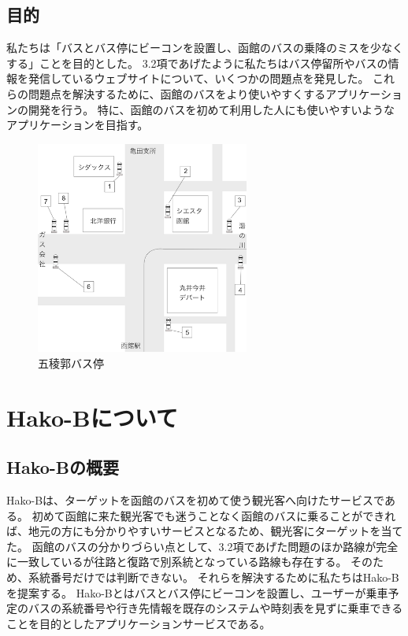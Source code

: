 \documentclass[openany,11pt,papersize]{jsbook}
\begin{document}

\section{目的}\label{sec:gaiyou}
私たちは「バスとバス停にビーコンを設置し、函館のバスの乗降のミスを少なくする」ことを目的とした。
3.2項であげたように私たちはバス停留所やバスの情報を発信しているウェブサイトについて、いくつかの問題点を発見した。
これらの問題点を解決するために、函館のバスをより使いやすくするアプリケーションの開発を行う。
特に、函館のバスを初めて利用した人にも使いやすいようなアプリケーションを目指す。


\begin{figure}[htbp]
  \begin{center}
    \includegraphics[clip,width=7.0cm]{img/14007.png}
    \caption{五稜郭バス停}
    \label{fig:goryo}
  \end{center}
\end{figure}

\chapter{Hako-Bについて}

\section{Hako-Bの概要}
Hako-Bは、ターゲットを函館のバスを初めて使う観光客へ向けたサービスである。
初めて函館に来た観光客でも迷うことなく函館のバスに乗ることができれば、地元の方にも分かりやすいサービスとなるため、観光客にターゲットを当てた。
函館のバスの分かりづらい点として、3.2項であげた問題のほか路線が完全に一致しているが往路と復路で別系統となっている路線も存在する。
そのため、系統番号だけでは判断できない。
それらを解決するために私たちはHako-Bを提案する。
Hako-Bとはバスとバス停にビーコンを設置し、ユーザーが乗車予定のバスの系統番号や行き先情報を既存のシステムや時刻表を見ずに乗車できることを目的としたアプリケーションサービスである。
\end{document}
